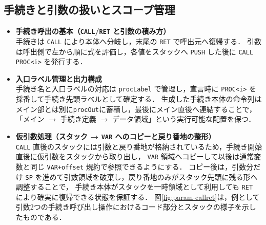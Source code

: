 \documentclass[a4j,10pt]{jarticle}
\begin{document}
\subsection{手続きと引数の扱いとスコープ管理}
\begin{itemize}
  \item \textbf{手続き呼出の基本（\texttt{CALL}/\texttt{RET} と引数の積み方）}\\
  手続きは \verb|CALL| により本体へ分岐し，末尾の \verb|RET| で呼出元へ復帰する．
  引数は呼出側で左から順に式を評価し，各値をスタックへ \verb|PUSH| した後に \verb|CALL PROC<i>| を発行する．

  \item \textbf{入口ラベル管理と出力構成}\\
  手続き名と入口ラベルの対応は \verb|procLabel| で管理し，宣言時に \texttt{PROC<i>} を採番して手続き先頭ラベルとして確定する．
  生成した手続き本体の命令列はメイン部とは別に\verb|procOut|に蓄積し，最後にメイン直後へ連結することで，
  「メイン $\rightarrow$ 手続き定義 $\rightarrow$ データ領域」という実行可能な配置を保つ．

  \item \textbf{仮引数処理（スタック → \texttt{VAR} へのコピーと戻り番地の整形）}\\
  \verb|CALL| 直後のスタックには引数と戻り番地が格納されているため，手続き開始直後に仮引数をスタックから取り出し，
  \texttt{VAR} 領域へコピーして以後は通常変数と同じ \texttt{VAR+offset} 規約で参照できるようにする．
  コピー後は，引数分だけ \verb|SP| を進めて引数領域を破棄し，戻り番地のみがスタック先頭に残る形へ調整することで，
  手続き本体がスタックを一時領域として利用しても \verb|RET| により確実に復帰できる状態を保証する．
  図\ref{fig:param-callret}は，例として引数2つの手続き呼び出し操作におけるコード部分とスタックの様子を示したものである．

  \begin{figure}[htb]
    \centering
    \small
    \setlength{\tabcolsep}{4pt}


\end{figure}
\end{itemize}
\end{document}
